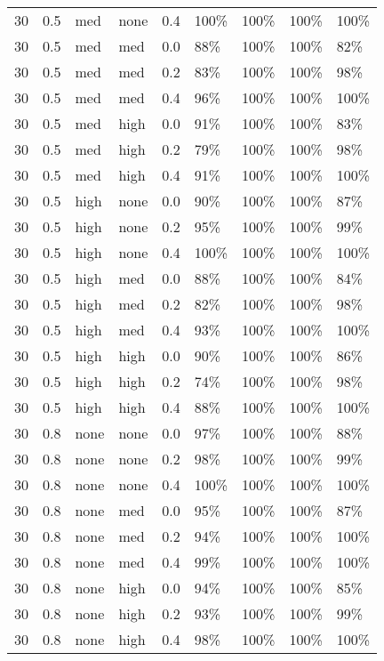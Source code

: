 \begin{longtable}{rrllrllll}
  30 & 0.5 & med & none & 0.4 & 100\% & 100\% & 100\% & 100\% \\ 
  30 & 0.5 & med & med & 0.0 & 88\% & 100\% & 100\% & 82\% \\ 
  30 & 0.5 & med & med & 0.2 & 83\% & 100\% & 100\% & 98\% \\ 
  30 & 0.5 & med & med & 0.4 & 96\% & 100\% & 100\% & 100\% \\ 
  30 & 0.5 & med & high & 0.0 & 91\% & 100\% & 100\% & 83\% \\ 
  30 & 0.5 & med & high & 0.2 & 79\% & 100\% & 100\% & 98\% \\ 
  30 & 0.5 & med & high & 0.4 & 91\% & 100\% & 100\% & 100\% \\ 
  30 & 0.5 & high & none & 0.0 & 90\% & 100\% & 100\% & 87\% \\ 
  30 & 0.5 & high & none & 0.2 & 95\% & 100\% & 100\% & 99\% \\ 
  30 & 0.5 & high & none & 0.4 & 100\% & 100\% & 100\% & 100\% \\ 
  30 & 0.5 & high & med & 0.0 & 88\% & 100\% & 100\% & 84\% \\ 
  30 & 0.5 & high & med & 0.2 & 82\% & 100\% & 100\% & 98\% \\ 
  30 & 0.5 & high & med & 0.4 & 93\% & 100\% & 100\% & 100\% \\ 
  30 & 0.5 & high & high & 0.0 & 90\% & 100\% & 100\% & 86\% \\ 
  30 & 0.5 & high & high & 0.2 & 74\% & 100\% & 100\% & 98\% \\ 
  30 & 0.5 & high & high & 0.4 & 88\% & 100\% & 100\% & 100\% \\ 
  30 & 0.8 & none & none & 0.0 & 97\% & 100\% & 100\% & 88\% \\ 
  30 & 0.8 & none & none & 0.2 & 98\% & 100\% & 100\% & 99\% \\ 
  30 & 0.8 & none & none & 0.4 & 100\% & 100\% & 100\% & 100\% \\ 
  30 & 0.8 & none & med & 0.0 & 95\% & 100\% & 100\% & 87\% \\ 
  30 & 0.8 & none & med & 0.2 & 94\% & 100\% & 100\% & 100\% \\ 
  30 & 0.8 & none & med & 0.4 & 99\% & 100\% & 100\% & 100\% \\ 
  30 & 0.8 & none & high & 0.0 & 94\% & 100\% & 100\% & 85\% \\ 
  30 & 0.8 & none & high & 0.2 & 93\% & 100\% & 100\% & 99\% \\ 
  30 & 0.8 & none & high & 0.4 & 98\% & 100\% & 100\% & 100\% \\ 

\end{longtable}
